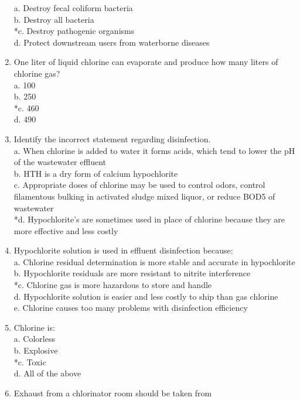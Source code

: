 \begin{enumerate}
a. Destroy fecal coliform bacteria \\
b. Destroy all bacteria \\
*c. Destroy pathogenic organisms \\
d. Protect downstream users from waterborne diseases \\
\item One liter of liquid chlorine can evaporate and produce how many liters of chlorine gas? \\
a. 100 \\
b. 250 \\
*c. 460 \\
d. 490 \\
\item Identify the incorrect statement regarding disinfection. \\
a. When chlorine is added to water it forms acids, which tend to lower the pH of the wastewater effluent \\
b. HTH is a dry form of calcium hypochlorite \\
c. Appropriate doses of chlorine may be used to control odors, control filamentous bulking in activated sludge mixed liquor, or reduce BOD5 of wastewater \\
*d. Hypochlorite’s are sometimes used in place of chlorine because they are more effective and less costly \\
\item Hypochlorite solution is used in effluent disinfection because: \\
a. Chlorine residual determination is more stable and accurate in hypochlorite \\
b. Hypochlorite residuals are more resistant to nitrite interference \\
*c. Chlorine gas is more hazardous to store and handle \\
d. Hypochlorite solution is easier and less costly to ship than gas chlorine \\
e. Chlorine causes too many problems with disinfection efficiency \\
\item Chlorine is: \\
a. Colorless \\
b. Explosive \\
*c. Toxic \\
d. All of the above \\
\item Exhaust from a chlorinator room should be taken from \\

\end{enumerate}
